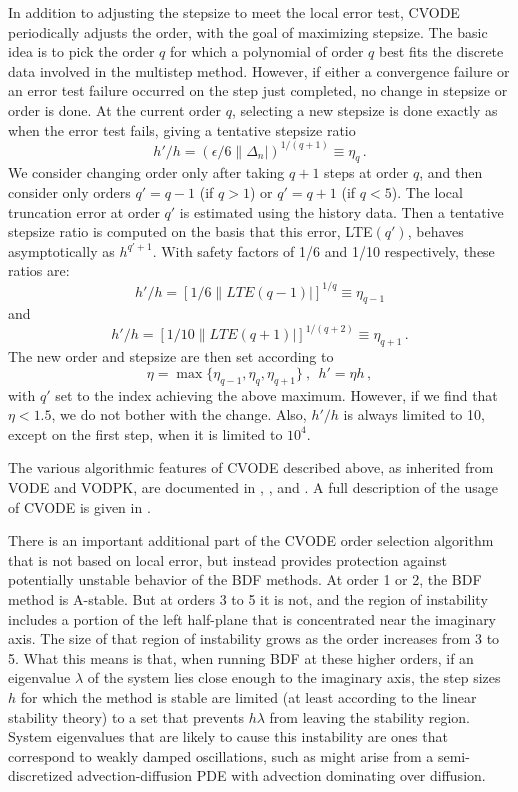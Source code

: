 In addition to adjusting the stepsize to meet the local error test,
CVODE periodically adjusts the order, with the goal of maximizing
stepsize.  The basic idea is to pick the order $q$ for which a
polynomial of order $q$ best fits the discrete data involved in the
multistep method.  However, if either a convergence failure or an
error test failure occurred on the step just completed, no change in
stepsize or order is done.  At the current order $q$, selecting a new
stepsize is done exactly as when the error test fails, giving a
tentative stepsize ratio
\[ h'/h = (\epsilon / 6 \|\Delta_n| )^{1/(q+1)} \equiv \eta_q \, . \]
We consider changing order only after taking $q+1$ steps at order $q$,
and then consider only orders $q' = q - 1$ (if $q > 1$) or
$q' = q + 1$ (if $q < 5$).  The local truncation error at order $q'$
is estimated using the history data.  Then a tentative stepsize ratio
is computed on the basis that this error, LTE$(q')$, behaves
asymptotically as $h^{q'+1}$.  With safety factors of 1/6 and
1/10 respectively, these ratios are:
\[ h'/h = [1 / 6 \|LTE(q-1)| ]^{1/q} \equiv \eta_{q-1} \]
and
\[ h'/h = [1 / 10 \|LTE(q+1)| ]^{1/(q+2)} \equiv \eta_{q+1} \, . \]
The new order and stepsize are then set according to
\[ \eta = \max\{\eta_{q-1},\eta_q,\eta_{q+1}\} ~,~~ h' = \eta h \, , \]
with $q'$ set to the index achieving the above maximum.
However, if we find that $\eta < 1.5$, we do not bother with the
change.  Also, $h'/h$ is always limited to 10, except on the first
step, when it is limited to $10^4$.

The various algorithmic features of CVODE described above, as
inherited from VODE and VODPK, are documented in \cite{BBH:89},
\cite{Byr:92}, and \cite{Hin:00}.  A full description of the usage
of CVODE is given in \cite{HiSe:03a}.

There is an important additional part of the CVODE order selection
algorithm that is not based on local error, but instead provides
protection against potentially unstable behavior of the BDF methods.
At order 1 or 2, the BDF method is A-stable.  But at orders 3 to 5 it
is not, and the region of instability includes a portion of the left
half-plane that is concentrated near the imaginary axis.  The size of
that region of instability grows as the order increases from 3 to 5.
What this means is that, when running BDF at these higher orders, if
an eigenvalue $\lambda$ of the system lies close enough to the
imaginary axis, the step sizes $h$ for which the method is stable are
limited (at least according to the linear stability theory) to a set
that prevents $h\lambda$ from leaving the stability region.  System
eigenvalues that are likely to cause this instability are ones that
correspond to weakly damped oscillations, such as might arise from a
semi-discretized advection-diffusion PDE with advection dominating
over diffusion.

